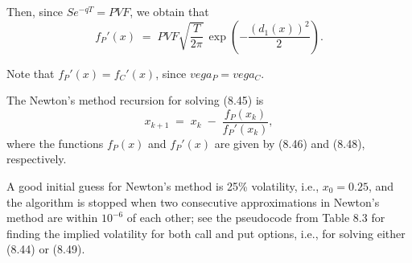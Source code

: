 
Then, since $Se^{-qT} = PVF$, we obtain that
\begin{equation}
f_P'(x) \;=\; PVF\sqrt{\frac{T}{2\pi}}\,\exp\!\left(-\frac{(d_1(x))^2}{2}\right).
\end{equation}

Note that $f_P'(x) = f_C'(x)$, since $vega_P = vega_C$.

The Newton's method recursion for solving (8.45) is
\begin{equation}
x_{k+1} \;=\; x_k \;-\; \frac{f_P(x_k)}{f_P'(x_k)},
\end{equation}
where the functions $f_P(x)$ and $f_P'(x)$ are given by (8.46) and (8.48),
respectively.

A good initial guess for Newton's method is 25\% volatility, i.e., $x_0 = 0.25$, and the
algorithm is stopped when two consecutive approximations in Newton's method are within
$10^{-6}$ of each other; see the pseudocode from Table 8.3 for finding the implied
volatility for both call and put options, i.e., for solving either (8.44) or (8.49).

\begin{table}[H]
\centering
\caption{Pseudocode for computing implied volatility}
\end{table}

